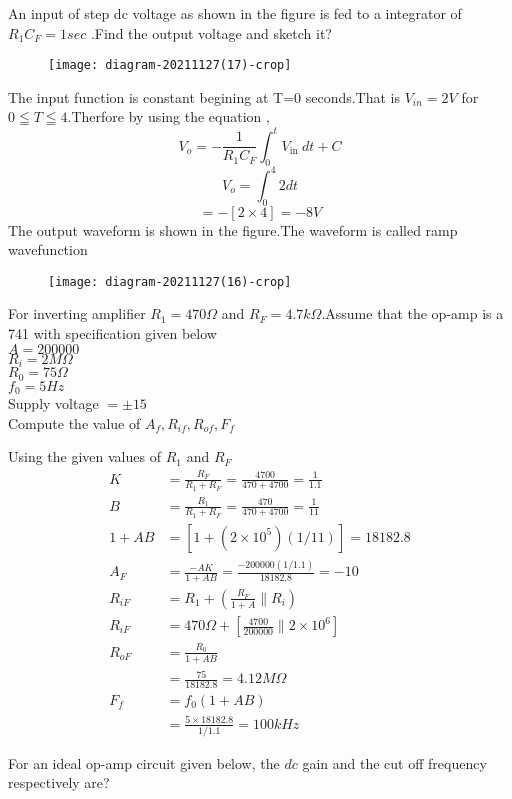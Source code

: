\begin{enumerate}
	\begin{minipage}{\textwidth}
		\item An input of step dc voltage as shown in the figure is fed to a integrator of $R_1C_F=1 sec$ .Find the output voltage and sketch it?
		\begin{figure}[H]
			\centering
			\texttt{[image: diagram-20211127(17)-crop]}
		\end{figure}
	\end{minipage}
	\begin{answer}
		The input function is constant begining at T=0 seconds.That is $V_{in}=2V$ for $0\leqq T \leqq4$.Therfore by using the equation ,
		$$
		V_{o}=-\frac{1}{R_{1} C_{F}} \int_{0}^{t} V_{\text {in }} d t+C
		$$
		$$V_o=\int_{0}^{4}2 dt$$
		$$=-\left[ 2\times 4\right] =-8V$$
		The output waveform is shown in the figure.The waveform is called ramp wavefunction
		\begin{figure}[H]
			\centering
			\texttt{[image: diagram-20211127(16)-crop]}
		\end{figure}	
	\end{answer}
	\begin{minipage}{\textwidth}
		\item For inverting amplifier $R_1=470\Omega$ and $R_F=4.7k\Omega$.Assume that the op-amp is a 741 with specification given below\\
		$A=200000$\\
		$R_i=2M\Omega$\\
		$R_0=75\Omega$\\
		$f_0=5Hz$\\
		Supply voltage $=\pm15$\\
		Compute the value of $A_f,R_{if},R_{of},F_f$
	\end{minipage}
	\begin{answer}
		Using the given values of $R_1$ and $R_F$\\
		\begin{align*}
		K&=\frac{R_F}{R_1+R_F}=\frac{4700}{470+4700}=\frac{1}{1.1}\\
		B&=\frac{R_1}{R_1+R_F}=\frac{470}{470+4700}=\frac{1}{11}\\
		1+AB&=\left[ 1+(2\times 10^5)(1/11)\right]=18182.8\\
		A_F&=\frac{-AK}{1+AB}=\frac{-200000(1/1.1)}{18182.8}=-10\\
		R_{iF}&=R_1+\left( \frac{R_F}{1+A}\parallel R_i\right) \\
		R_{iF}&=470\Omega+\left[ \frac{4700}{200000}\parallel 2\times 10^6\right]\\ 
		R_{oF}&=\frac{R_0}{1+AB}\\&=\frac{75}{18182.8}=4.12M\Omega\\
		F_f&=f_0(1+AB)\\&=\frac{5 \times 18182.8}{1/1.1}=100kHz
		\end{align*}
	\end{answer}
\item For an ideal op-amp circuit given below, the $d c$ gain and the cut off frequency respectively are?


\end{enumerate}
